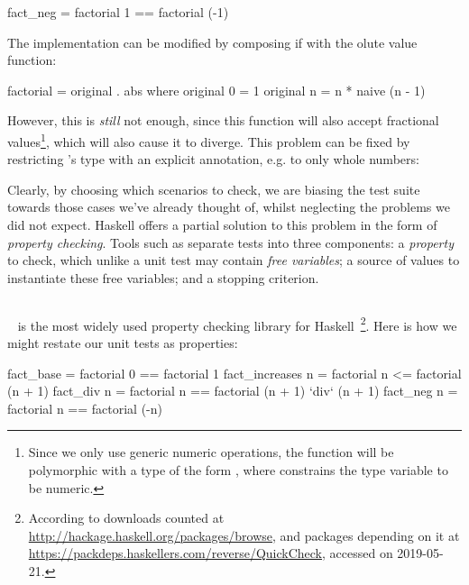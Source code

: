 \begin{haskell}
fact_neg = factorial 1 == factorial (-1)
\end{haskell}

The implementation can be modified by composing if with the olute value
function:

\begin{haskell}
factorial = original . abs
  where original 0 = 1
        original n = n * naive (n - 1)
\end{haskell}

However, this is \emph{still} not enough, since this function will also accept
fractional values\footnote{Since we only use generic numeric operations, the
  function will be polymorphic with a type of the form
  , where  constrains the type variable
   to be numeric.}, which will also cause it to diverge. This problem can
be fixed by restricting 's type with an explicit annotation, e.g.
to only whole numbers: 

Clearly, by choosing which scenarios to check, we are biasing the test suite
towards those cases we've already thought of, whilst neglecting the problems we
did not expect. Haskell offers a partial solution to this problem in the form of \emph{property checking}. Tools such as \quickcheck{} separate tests into three components: a \emph{property} to check, which unlike a unit test may contain
\emph{free variables}; a source of values to instantiate these free variables; and a
stopping criterion.

\subsection{\quickcheck{}}
\label{sec:quickcheck}

\quickcheck{}~\cite{claessen2011quickcheck} is the most widely used property
checking library for
Haskell~\footnote{According to downloads counted at
  \url{http://hackage.haskell.org/packages/browse}, and packages depending on
  it at \url{https://packdeps.haskellers.com/reverse/QuickCheck}, accessed on
  2019-05-21.}. Here is how we might restate our unit tests as \quickcheck{}
properties:

\begin{haskell}
fact_base        = factorial 0 == factorial 1
fact_increases n = factorial n <= factorial (n + 1)
fact_div       n = factorial n == factorial (n + 1) `div` (n + 1)
fact_neg       n = factorial n == factorial (-n)
\end{haskell}

